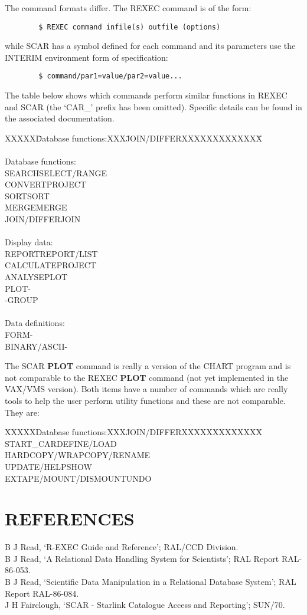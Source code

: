 The command formats differ.
The REXEC command is of the form:
\begin{verbatim}
        $ REXEC command infile(s) outfile (options)
\end{verbatim}
while SCAR has a symbol defined for each command and its parameters use the
INTERIM environment form of specification:
\begin{verbatim}
        $ command/par1=value/par2=value...
\end{verbatim}
The table below shows which commands perform similar functions in REXEC and
SCAR (the `CAR\_' prefix has been omitted).
Specific details can be found in the associated documentation.
\begin{tabbing}
XXXXX\=Database functions:XXX\=JOIN/DIFFERXXXXXXXXXXXXX\=\kill
\>\\
\\
Database functions:\\
\>SEARCH\>SELECT/RANGE\\
\>CONVERT\>PROJECT\\
\>SORT\>SORT\\
\>MERGE\>MERGE\\
\>JOIN/DIFFER\>JOIN\\
\\
Display data:\\
\>REPORT\>REPORT/LIST\\
\>CALCULATE\>PROJECT\\
\>ANALYSE\>PLOT\\
\>PLOT\>-\\
\>-\>GROUP\\
\\
Data definitions:\\
\>FORM\>-\\
\>BINARY/ASCII\>-
\end{tabbing}
The SCAR {\bf PLOT} command is really a version of the CHART program and is not
comparable to the REXEC {\bf PLOT} command (not yet implemented in the VAX/VMS
version).
Both items have a number of commands which are really tools to help the user
perform utility functions and these are not comparable.
They are:
\begin{tabbing}
XXXXXDatabase functions:XXX\=JOIN/DIFFERXXXXXXXXXXXXX\=\kill
\>\+START\_CAR\>DEFINE/LOAD\\
HARDCOPY/WRAP\>COPY/RENAME\\
UPDATE/HELP\>SHOW\\
EXTAPE/MOUNT/DISMOUNT\>UNDO
\end{tabbing}
\section {REFERENCES}
B J Read, `R-EXEC Guide and Reference'; RAL/CCD Division.\\
B J Read, `A Relational Data Handling System for Scientists'; RAL Report
RAL-86-053.\\
B J Read, `Scientific Data Manipulation in a Relational Database System';
RAL Report RAL-86-084.\\
J H Fairclough, `SCAR - Starlink Catalogue Access and Reporting'; SUN/70.


